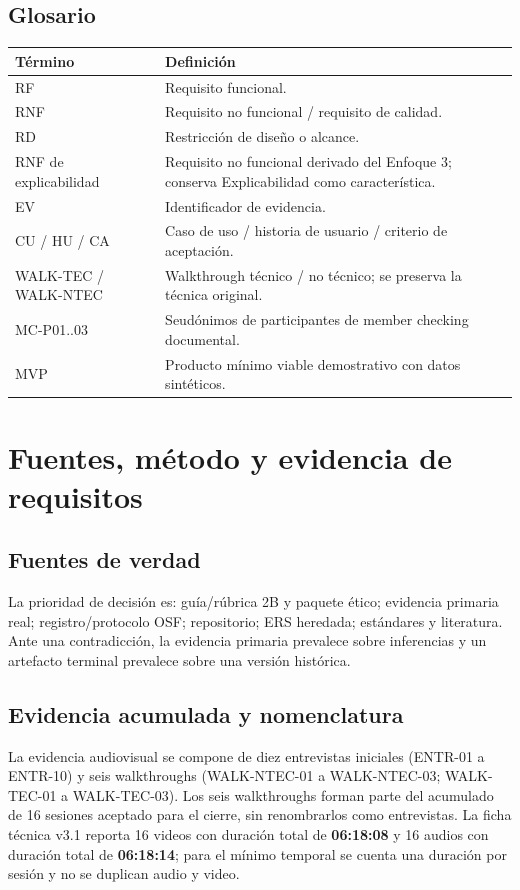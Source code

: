 \documentclass[11pt,a4paper,twoside]{article}
\begin{document}
\subsection{Glosario}
\begin{tabularx}{\textwidth}{p{2.7cm}X}\toprule
Término & Definición \\ \midrule
RF & Requisito funcional.\\
RNF & Requisito no funcional / requisito de calidad.\\
RD & Restricción de diseño o alcance.\\
RNF de explicabilidad & Requisito no funcional derivado del Enfoque 3; conserva Explicabilidad como característica.\\
EV & Identificador de evidencia.\\
CU / HU / CA & Caso de uso / historia de usuario / criterio de aceptación.\\
WALK-TEC / WALK-NTEC & Walkthrough técnico / no técnico; se preserva la técnica original.\\
MC-P01..03 & Seudónimos de participantes de member checking documental.\\
MVP & Producto mínimo viable demostrativo con datos sintéticos.\\
\bottomrule\end{tabularx}

\section{Fuentes, método y evidencia de requisitos}
\subsection{Fuentes de verdad}
La prioridad de decisión es: guía/rúbrica 2B y paquete ético; evidencia primaria real; registro/protocolo OSF; repositorio; ERS heredada; estándares y literatura. Ante una contradicción, la evidencia primaria prevalece sobre inferencias y un artefacto terminal prevalece sobre una versión histórica.

\subsection{Evidencia acumulada y nomenclatura}
La evidencia audiovisual se compone de diez entrevistas iniciales (ENTR-01 a ENTR-10) y seis walkthroughs (WALK-NTEC-01 a WALK-NTEC-03; WALK-TEC-01 a WALK-TEC-03). Los seis walkthroughs forman parte del acumulado de 16 sesiones aceptado para el cierre, sin renombrarlos como entrevistas. La ficha técnica v3.1 reporta 16 videos con duración total de \textbf{06:18:08} y 16 audios con duración total de \textbf{06:18:14}; para el mínimo temporal se cuenta una duración por sesión y no se duplican audio y video.
\end{document}
